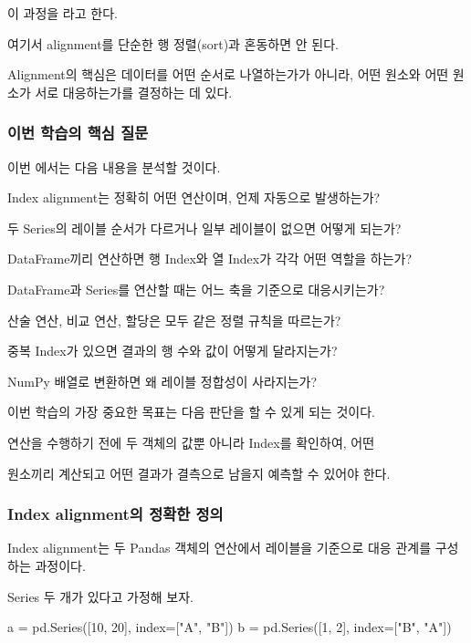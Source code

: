 이 과정을 라고 한다.

여기서 alignment를 단순한 행 정렬(sort)과 혼동하면 안 된다.

Alignment의 핵심은 데이터를 어떤 순서로 나열하는가가 아니라, 어떤 원소와 어떤 원소가 서로 대응하는가를 결정하는 데 있다.

\subsubsection{이번 학습의 핵심 질문}

이번 에서는 다음 내용을 분석할 것이다.

\begin{dhksmry}
Index alignment는 정확히 어떤 연산이며, 언제 자동으로 발생하는가?

두 Series의 레이블 순서가 다르거나 일부 레이블이 없으면 어떻게 되는가?

DataFrame끼리 연산하면 행 Index와 열 Index가 각각 어떤 역할을 하는가?

DataFrame과 Series를 연산할 때는 어느 축을 기준으로 대응시키는가?

산술 연산, 비교 연산, 할당은 모두 같은 정렬 규칙을 따르는가?

중복 Index가 있으면 결과의 행 수와 값이 어떻게 달라지는가?

NumPy 배열로 변환하면 왜 레이블 정합성이 사라지는가?
\end{dhksmry}

이번 학습의 가장 중요한 목표는 다음 판단을 할 수 있게 되는 것이다.

\begin{dhksmry}[centered]
연산을 수행하기 전에 두 객체의 값뿐 아니라 Index를 확인하여, 어떤 

원소끼리 계산되고 어떤 결과가 결측으로 남을지 예측할 수 있어야 한다.
\end{dhksmry}

\subsubsection{Index alignment의 정확한 정의}

Index alignment는 두 Pandas 객체의 연산에서 레이블을 기준으로 대응 관계를 구성하는 과정이다.

Series 두 개가 있다고 가정해 보자.

\begin{dhkcode}
a = pd.Series([10, 20], index=["A", "B"])
b = pd.Series([1, 2], index=["B", "A"])
\end{dhkcode}

